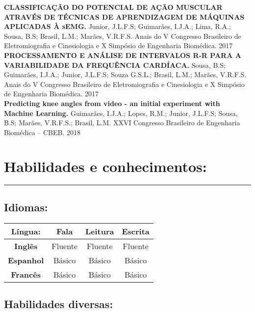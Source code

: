 \documentclass[11pt]{article}
\begin{document}
\textbf{CLASSIFICAÇÃO DO POTENCIAL DE AÇÃO MUSCULAR ATRAVÉS DE TÉCNICAS DE APRENDIZAGEM 
DE MÁQUINAS APLICADAS À sEMG.}
Junior, J.L.F.S; Guimarães, I.J.A.; Lima, R.A.; Sousa, B.S; Brasil, L.M.; Marães, V.R.F.S.
Anais do V Congresso Brasileiro de Eletromiografia e Cinesiologia e X Simpósio de Engenharia Biomédica. 2017 \\

\textbf{PROCESSAMENTO E ANÁLISE DE INTERVALOS R-R PARA A VARIABILIDADE DA FREQUÊNCIA CARDÍACA.}
Sousa, B.S; Guimarães, I.J.A.; Junior, J.L.F.S; Souza G.S.L.; Brasil, L.M.; Marães, V.R.F.S.
Anais do V Congresso Brasileiro de Eletromiografia e Cinesiologia e X Simpósio de Engenharia Biomédica. 2017 \\

\textbf{Predicting knee angles from video - an initial experiment with Machine Learning.}
Guimarães, I.J.A.; Lopes, R.M.; Junior, J.L.F.S; Sousa, B.S; Marães, V.R.F.S.; Brasil, L.M.
XXVI Congresso Brasileiro de Engenharia Biomédica – CBEB. 2018 \\

\newpage
\section{Habilidades e conhecimentos:}
\hrule \vspace{0.1cm}

\subsection{Idiomas:}
\begin{center}
\begin{tabular}{c | c | c | c}
\hline
\textbf{Língua:} & Fala & Leitura & Escrita \\
\hline
\hline
\textbf{Inglês} &  Fluente & Fluente & Fluente  \\
\hline
\textbf{Espanhol} & Básico & Básico & Básico \\
\hline
\textbf{Francês} & Básico & Básico & Básico \\
\hline
\end{tabular}
\end{center}

\subsection{Habilidades diversas:}
\end{document}
